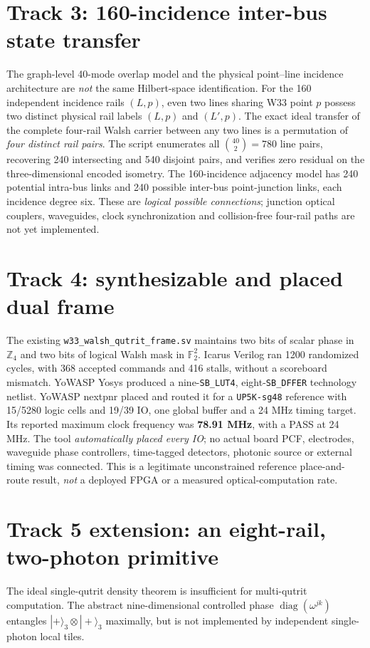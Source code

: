 \documentclass[10pt]{article}
\begin{document}
\section{Track 3: 160-incidence inter-bus state transfer}
The graph-level 40-mode overlap model and the physical
point--line incidence architecture are \emph{not}
the same Hilbert-space identification. For the
160 independent incidence rails $(L,p)$, even two
lines sharing W33 point $p$ possess two distinct
physical rail labels $(L,p)$ and $(L',p)$.
The exact ideal transfer of the complete four-rail
Walsh carrier between any two lines is a permutation
of \emph{four distinct rail pairs}.
The script enumerates all $\binom{40}{2}=780$
line pairs, recovering 240 intersecting and
540 disjoint pairs, and verifies zero residual
on the three-dimensional encoded isometry.
The 160-incidence adjacency model has
240 potential intra-bus links and 240 possible
inter-bus point-junction links, each incidence
degree six. These are \emph{logical possible
connections}; junction optical couplers, waveguides,
clock synchronization and collision-free four-rail
paths are not yet implemented.

\section{Track 4: synthesizable and placed dual frame}
The existing \texttt{w33\_walsh\_qutrit\_frame.sv}
maintains two bits of scalar phase in $\mathbb Z_4$
and two bits of logical Walsh mask in $\mathbb F_2^2$.
Icarus Verilog ran 1200 randomized cycles, with
368 accepted commands and 416 stalls, without
a scoreboard mismatch. YoWASP Yosys produced a
nine-\texttt{SB\_LUT4}, eight-\texttt{SB\_DFFER}
technology netlist. YoWASP nextpnr placed and
routed it for a \texttt{UP5K-sg48} reference
with 15/5280 logic cells and 19/39 IO,
one global buffer and a 24 MHz timing target.
Its reported maximum clock frequency was
\textbf{78.91 MHz}, with a PASS at 24 MHz.
The tool \emph{automatically placed every IO};
no actual board PCF, electrodes, waveguide
phase controllers, time-tagged detectors,
photonic source or external timing was connected.
This is a legitimate unconstrained reference
place-and-route result, \emph{not} a deployed FPGA
or a measured optical-computation rate.

\section{Track 5 extension: an eight-rail, two-photon primitive}
The ideal single-qutrit density theorem is
insufficient for multi-qutrit computation.
The abstract nine-dimensional
controlled phase $\operatorname{diag}(\omega^{jk})$
entangles $|+\rangle_3\otimes|+\rangle_3$
maximally, but is not implemented by
independent single-photon local tiles.
\end{document}
